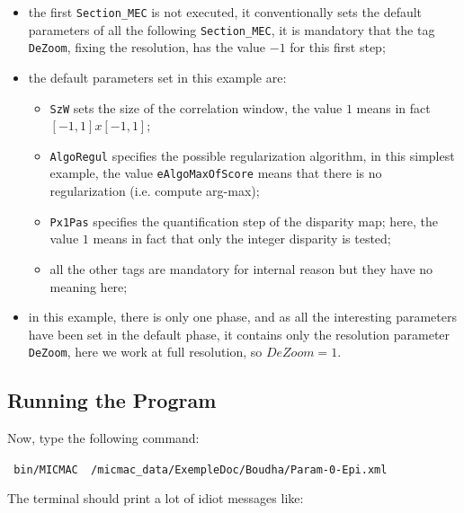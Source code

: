 \begin{itemize}
    \item the first {\tt Section\_MEC}  is not executed, it conventionally sets the default
          parameters of all the following  {\tt Section\_MEC}, it is mandatory that the
          tag {\tt DeZoom}, fixing the resolution, has the value $-1$ for this first step;


    \item the default parameters set in this example are:

\begin{itemize}
         \item {\tt SzW} sets the size of the correlation window, the value $1$
               means in fact $[-1,1]x[-1,1]$;

          \item {\tt AlgoRegul} specifies the possible regularization algorithm,  in this
                simplest example, the value {\tt eAlgoMaxOfScore} means that there is
                no regularization (i.e. compute arg-max);

          \item {\tt Px1Pas} specifies the quantification step of  the disparity map;
                here, the value $1$ means in fact that  only the integer disparity is tested;

          \item all the other tags are mandatory for internal reason but they have no
                meaning here;
\end{itemize}

    \item in this example, there is only one phase, and as all the interesting parameters
          have been set in the default phase, it contains only the resolution parameter
          {\tt DeZoom}, here we work at full resolution, so $DeZoom=1$.

\end{itemize}



\subsection{Running the Program}

Now, type the following command:

{\tt
bin/MICMAC ~/micmac\_data/ExempleDoc/Boudha/Param-0-Epi.xml
}

The terminal should print a lot of idiot messages like:

